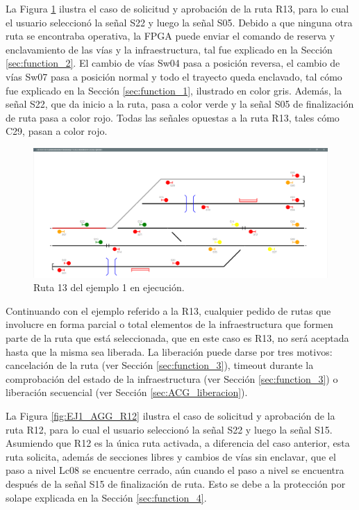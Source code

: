 	La Figura \ref{fig:EJ1_AGG_R13}	ilustra el caso de solicitud y aprobación de la ruta R13, para lo cual el usuario seleccionó la señal S22 y luego la señal S05. Debido a que ninguna otra ruta se encontraba operativa, la FPGA puede enviar el comando de reserva y enclavamiento de las vías y la infraestructura, tal fue explicado en la Sección \ref{sec:function_2}. El cambio de vías Sw04 pasa a posición reversa, el cambio de vías Sw07 pasa a posición normal y todo el trayecto queda enclavado, tal cómo fue explicado en la Sección \ref{sec:function_1}, ilustrado en color gris. Además, la señal S22, que da inicio a la ruta, pasa a color verde y la señal S05 de finalización de ruta pasa a color rojo. Todas las señales opuestas a la ruta R13, tales cómo C29, pasan a color rojo. 
	
	\begin{figure}[H]
		\centering
		\includegraphics[origin = c, width=1\textwidth]{resultados-obtenidos/ejemplo1/images/AGG_R13}
		\centering\caption{Ruta 13 del ejemplo 1 en ejecución.}
		\label{fig:EJ1_AGG_R13}
	\end{figure}
	
	Continuando con el ejemplo referido a la R13, cualquier pedido de rutas que involucre en forma parcial o total elementos de la infraestructura que formen parte de la ruta que está seleccionada, que en este caso es R13, no será aceptada hasta que la misma sea liberada. La liberación puede darse por tres motivos: cancelación de la ruta (ver Sección \ref{sec:function_3}), timeout durante la comprobación del estado de la infraestructura (ver Sección \ref{sec:function_3}) o liberación secuencial (ver Sección \ref{sec:ACG_liberacion}).	
	
	La Figura \ref{fig:EJ1_AGG_R12}	ilustra el caso de solicitud y aprobación de la ruta R12, para lo cual el usuario seleccionó la señal S22 y luego la señal S15. Asumiendo que R12 es la única ruta activada, a diferencia del caso anterior, esta ruta solicita, además de secciones libres y cambios de vías sin enclavar, que el paso a nivel Lc08 se encuentre cerrado, aún cuando el paso a nivel se encuentra después de la señal S15 de finalización de ruta. Esto se debe a la protección por solape explicada en la Sección \ref{sec:function_4}.

